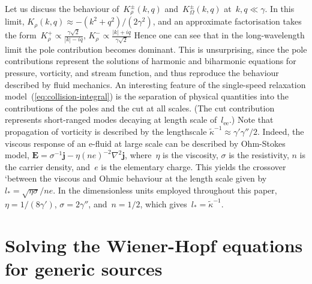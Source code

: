 \documentclass[preprint,aps,eqsecnum, prb]{revtex4-1}
\newcommand{\fplus}[1]{{#1}^{+}}
\newcommand{\fminus}[1]{{#1}^{-}}
\newcommand{\fplusminus}[1]{{#1}^{\pm}}
\begin{document}
Let us discuss the behaviour of~$\fplusminus{K}_\rho(k, q)$
and~$\fplusminus{K}_\Omega(k, q)$ at~$k, q \ll \gamma$. In this limit,
$K_\rho(k, q)  \approx -  (k^2 + q^2)/(2\gamma^2)$, and an approximate
factorisation takes
the form~$\fplus{K}_\rho \propto \frac{\gamma \sqrt{2}}{|k| - i q}$,
$\fminus{K}_\rho \propto \frac{|k| + i q}{\gamma \sqrt{2}}$
Hence one can see that in the
long-wavelength limit the pole contribution becomes dominant.
This is unsurprising,
since the pole contributions
represent the solutions of harmonic and biharmonic equations for
pressure, vorticity, and stream function, and thus reproduce
the behaviour described by fluid mechanics. An interesting feature
of the single-speed relaxation model~(\ref{eq:collision-integral}) is the
separation of physical quantities into the contributions of the
poles and the cut at all scales. (The cut contribution represents
short-ranged modes decaying at length scale of~$l_\mathrm{ee}$.)
Note that propagation of vorticity is described by the lengthscale
${\tilde \kappa}^{-1} \approx \gamma' \gamma'' / 2$. Indeed, the viscous
response of an e-fluid at large scale can be described by Ohm-Stokes model,
${\bm E} = \sigma^{-1}  {\bm j} - \eta (ne)^{-2} \nabla^2 {\bm j}$,
where~$\eta$ is the viscosity, $\sigma$ is the resistivity, $n$
is the carrier density, and~$e$ is the elementary charge.
This yields
the  crossover `between the viscous and Ohmic behaviour at the
length scale given
by~$l_\ast = \sqrt{\eta \sigma} / ne$. In the dimensionless units
employed throughout this paper,
$\eta = 1/(8 \gamma')$, $\sigma = 2\gamma''$, and~$n = 1/2$, which
gives~$l_\ast = {\tilde \kappa}^{-1}$.

\section{Solving the Wiener-Hopf equations for generic sources}
\label{sec:wh-solution}
\end{document}
